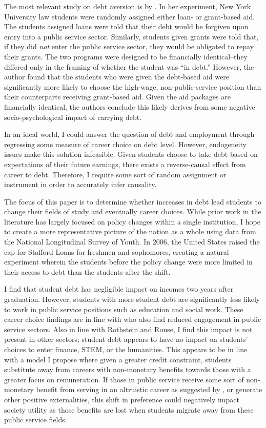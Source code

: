 \documentclass[12pt]{article}
\begin{document}
	The most relevant study on debt aversion is by \textcite{field2009}. In her experiment, New York University law students were randomly assigned either loan- or grant-based aid. The students assigned loans were told that their debt would be forgiven upon entry into a public service sector. Similarly, students given grants were told that, if they did \emph{not} enter the public service sector, they would be obligated to repay their grants. The two programs were designed to be financially identical--they differed only in the framing of whether the student was ``in debt.'' However, the author found that the students who were given the debt-based aid were significantly more likely to choose the high-wage, non-public-service position than their counterparts receiving grant-based aid. Given the aid packages are financially identical, the authors conclude this likely derives from some negative socio-psychological impact of carrying debt.
	
	In an ideal world, I could answer the question of debt and employment through regressing some measure of career choice on debt level. However, endogeneity issues make this solution infeasible. Given students choose to take debt based on expectations of their future earnings, there exists a reverse-causal effect from career to debt. Therefore, I require some sort of random assignment or instrument in order to accurately infer causality. 
	
	The focus of this paper is to determine whether increases in debt lead students to change their fields of study and eventually career choices. While prior work in the literature has largely focused on policy changes within a single institution, I hope to create a more representative picture of the nation as a whole using data from the National Longitudinal Survey of Youth. In 2006, the United States raised the cap for Stafford Loans for freshmen and sophomores, creating a natural experiment wherein the students before the policy change were more limited in their access to debt than the students after the shift.
	
	I find that student debt has negligible impact on incomes two years after graduation. However, students with more student debt are significantly less likely to work in public service positions such as education and social work. These career choice findings are in line with \textcite{rothstein2011} who also find reduced engagement in public service sectors. Also in line with Rothstein and Rouse, I find this impact is not present in other sectors; student debt appears to have no impact on students' choices to enter finance, STEM, or the humanities. This appears to be in line with a model I propose where given a greater credit constraint, students substitute away from careers with non-monetary benefits towards those with a greater focus on remuneration. If those in public service receive some sort of non-monetary benefit from serving in an altruistic career as suggested by \textcite{hanson1995}, or generate other positive externalities, this shift in preference could negatively impact society utility as those benefits are lost when students migrate away from these public service fields.
	
\end{document}
